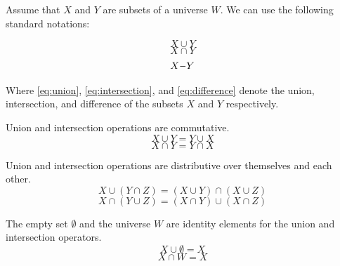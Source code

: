 \documentclass[a4paper,11pt,oneside]{article}
\newcommand{\minus}{\scalebox{0.9}[1.0]{$-$}} %
\begin{document}
\theoremstyle{remark}
\newtheorem*{remark}{Remark}
      
\begin{definition}
	Assume that $X$ and $Y$ are subsets of a universe $W$. We can use the following standard notations:
	      
	\begin{equation} \label{eq:union}
		X \cup Y
	\end{equation}
	\begin{equation} \label{eq:intersection}
		X \cap Y
	\end{equation}
	\begin{equation} \label{eq:difference}
		X \minus Y
	\end{equation}
	        
	Where \eqref{eq:union}, \eqref{eq:intersection}, and \eqref{eq:difference} denote the union, intersection, and difference of the subsets $X$     and $Y$ respectively. \cite{mansfield_1987}
	        
\end{definition}

\begin{property}
	\label{prop:3.1}
	Union and intersection operations are commutative. \cite{mansfield_1987}
	\begin{equation*}
		X \cup Y = Y \cup X
	\end{equation*}
	\begin{equation*}
		X \cap Y = Y \cap X
	\end{equation*}
\end{property}
        
\begin{property}
	\label{prop:3.2}
	Union and intersection operations are distributive over themselves and each other. \cite{mansfield_1987}
	\begin{equation*}
		X \cup (Y \cap Z) = (X \cup Y) \cap (X \cup Z)
	\end{equation*}
	\begin{equation*}
		X \cap (Y \cup Z) = (X \cap Y) \cup (X \cap Z)
	\end{equation*}
\end{property}
        
\begin{property}
	\label{prop:3.3}
	The empty set $\emptyset$ and the universe $W$ are identity elements for the union and intersection operators. \cite{mansfield_1987}
	\begin{equation*}
		X \cup \emptyset = X
	\end{equation*}
	\begin{equation*}
		X \cap W = X
	\end{equation*}
\end{property}
        
\end{document}
